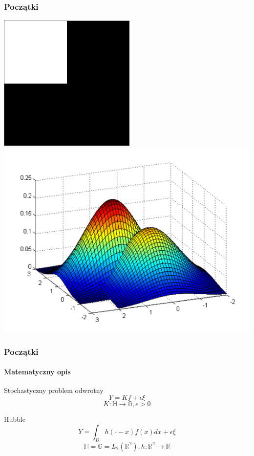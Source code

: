 \documentclass{beamer}
\begin{document}
\begin{frame}
\begin{center}
	\end{center}
\end{frame}

\begin{frame}\frametitle{Początki}
\begin{center}
\includegraphics[scale=0.4]{6}
\includegraphics[scale=0.4]{5}
\end{center}
\end{frame}

\begin{frame}\frametitle{Początki}\framesubtitle{Matematyczny opis}

\begin{block}{Stochastyczny problem odwrotny}
\begin{displaymath}
Y=Kf+\epsilon\xi
\end{displaymath}
\begin{displaymath}
K\colon \mathbb{H}\to \mathbb{G}, \epsilon>0
\end{displaymath}
\end{block}
\begin{block}{Hubble}
\begin{displaymath}
Y=\int_Dh(\cdot-x)f(x)dx+\epsilon\xi
\end{displaymath}
\begin{displaymath}
\mathbb{H}= \mathbb{G}=L_2(\mathbb{R}^2), h\colon \mathbb{R}^2\to \mathbb{R}
\end{displaymath}
\end{block}
\end{frame}
\end{document}
